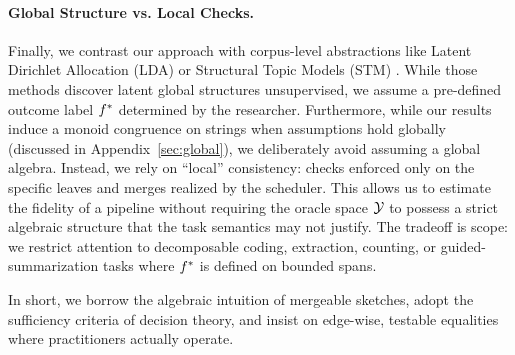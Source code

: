 \paragraph{Global Structure vs. Local Checks.}
Finally, we contrast our approach with corpus-level abstractions like Latent Dirichlet Allocation (LDA) or Structural Topic Models (STM) \citep{BleiNgJordan2003,RobertsStewartTingley2014}. While those methods discover latent global structures unsupervised, we assume a pre-defined outcome label $f^{\ast}$ determined by the researcher.
Furthermore, while our results induce a monoid congruence on strings when assumptions hold globally (discussed in Appendix~\ref{sec:global}), we deliberately avoid assuming a global algebra. Instead, we rely on ``local'' consistency: checks enforced only on the specific leaves and merges realized by the scheduler. This allows us to estimate the fidelity of a pipeline without requiring the oracle space $\mathcal{Y}$ to possess a strict algebraic structure that the task semantics may not justify. The tradeoff is scope: we restrict attention to decomposable coding, extraction, counting, or guided-summarization tasks where $f^{\ast}$ is defined on bounded spans.

\bigskip
\noindent
In short, we borrow the algebraic intuition of mergeable sketches, adopt the sufficiency criteria of decision theory, and insist on edge-wise, testable equalities where practitioners actually operate.
